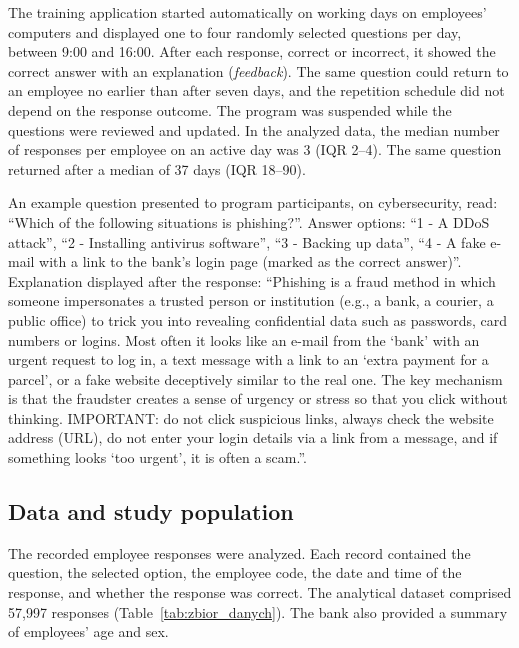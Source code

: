 \documentclass[preprint,12pt,authoryear]{elsarticle}
\begin{document}
The training application started automatically on working days on employees' computers and displayed
one to four randomly selected questions per day, between 9:00 and 16:00. After each response, correct
or incorrect, it showed the correct answer with an explanation (\emph{feedback}). The same question
could return to an employee no earlier than after seven days, and the repetition schedule did not
depend on the response outcome. The program was suspended while the questions were reviewed and
updated. In the analyzed data, the median number of responses per employee on an active day was
3 (IQR 2--4). The same question returned after a median of
37 days (IQR 18--90).

An example question presented to program participants, on cybersecurity, read:
``Which of the following situations is phishing?''. Answer options:
``1 - A DDoS attack'',
``2 - Installing antivirus software'',
``3 - Backing up data'',
``4 - A fake e-mail with a link to the bank's login page (marked as the correct answer)''.
Explanation displayed after the response:
``Phishing is a fraud method in which someone impersonates a trusted person or institution (e.g., a bank, a courier, a public office) to trick you into revealing confidential data such as passwords, card numbers or logins. Most often it looks like an e-mail from the `bank' with an urgent request to log in, a text message with a link to an `extra payment for a parcel', or a fake website deceptively similar to the real one. The key mechanism is that the fraudster creates a sense of urgency or stress so that you click without thinking. IMPORTANT: do not click suspicious links, always check the website address (URL), do not enter your login details via a link from a message, and if something looks `too urgent', it is often a scam.''.

\subsection{Data and study population}
\label{sec:dane}
The recorded employee responses were analyzed. Each record contained the question, the selected
option, the employee code, the date and time of the response, and whether the response was correct.
The analytical dataset comprised 57{,}997 responses
(Table~\ref{tab:zbior_danych}). The bank also provided a summary of employees' age and sex.
\end{document}
